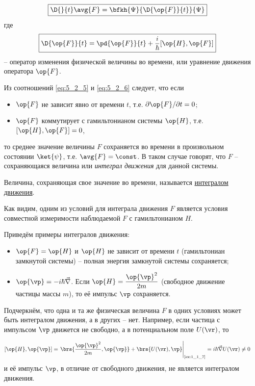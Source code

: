 \begin{equation}
\label{eq:5_2_5}
  \boxed{
    \D{}{t} \avg{F} = \bfkh{\Psi}{\D{\op{F}}{t}}{\Psi}
  }
\end{equation}%
%
где
\begin{equation}
\label{eq:5_2_6}
\boxed{\D{\op{F}}{t} = \pd{\op{F}}{t} + \frac{i}{\hbar} [\op{H}, \op{F}]}
\end{equation}
-- оператор изменения физической величины во времени, или уравнение движения оператора $\op{F}$.

Из соотношений \eqref{eq:5_2_5} и \eqref{eq:5_2_6} следует, что если
\begin{itemize}
\item $\op{F}$ не зависит явно от времени $t$, т.е. $\partial\op{F}/\partial{t} = 0$;
\item $\op{F}$ коммутирует с гамильтонианом системы $\op{H}$, т.е. $[\op{H}, \op{F}]=0$,
\end{itemize}%
%
то среднее значение величины $F$ сохраняется во времени в произвольном состоянии $\ket{\psi}$, т.е. $\avg{F} = \const$. В таком случае говорят, что $F$ -- сохраняющаяся величина или {\em интеграл движения} для данной системы.

\begin{defn}
Величина, сохраняющая свое значение во времени, называется \underline{интегралом движения}.
\end{defn}%
%
Как видим, одним из условий для интеграла движения $F$ является условия совместной измеримости наблюдаемой $F$ с гамильтонианом $H$.

Приведём примеры интегралов движения:

\begin{itemize}
\item $\op{F} = \op{H}$ и $\op{H}$ не зависит от времени $t$ (гамильтониан замкнутой системы) -- полная энергия замкнутой системы сохраняется;
\item $\op{\vp} = - i \hbar \vec{\nabla}$.  Если $\displaystyle\op{H} = \frac{\op{\vp}^2}{2m}$ (свободное движение частицы массы $m$), то её импульс $\vp$ сохраняется.
\end{itemize}%
%
Подчеркнём, что одна и та же физическая величина $F$ в одних условиях может быть интегралом движения, а в других -- нет. Например, если частица с импульсом $\vp$ движется не свободно, а в потенциальном поле $U(\vr)$, то

\begin{equation}
\label{eq:5_2_7}
  [\op{H}, \op{\vp}] =
  \left.
    \brs{\frac{\op{\vp}^2}{2m}, \op{\vp}} + \brs{U(\vr), \vp}
  \right|_{\text{\cref{ex:1_1_7}}} =
  i \hbar \vec{\nabla} U(\vr) \ne 0
\end{equation}%
%
и её импульс $\vp$, в отличие от свободного движения, не является интегралом движения.


